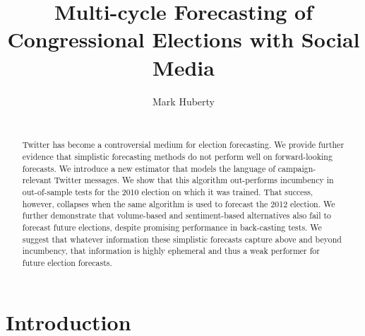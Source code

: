 \documentclass{sig-alternate-2013}
\begin{document}
\title{Multi-cycle Forecasting of Congressional Elections with Social Media}
\author{\alignauthor
Mark Huberty\\
\\
}

\maketitle

\begin{abstract}
  Twitter has become a controversial medium for election forecasting. We provide further evidence that simplistic forecasting methods do not perform well on forward-looking forecasts. We introduce a new estimator that models the language of campaign-relevant Twitter messages. We show that this algorithm out-performs incumbency in out-of-sample tests for the 2010 election on which it was trained. That success, however, collapses when the same algorithm is used to forecast the 2012 election. We further demonstrate that volume-based and sentiment-based alternatives also fail to forecast future elections, despite promising performance in back-casting tests. We suggest that whatever information these simplistic forecasts capture above and beyond incumbency, that information is highly ephemeral and thus a weak performer for future election forecasts.
\end{abstract}



\section{Introduction}
\label{sec:introduction}
\end{document}
